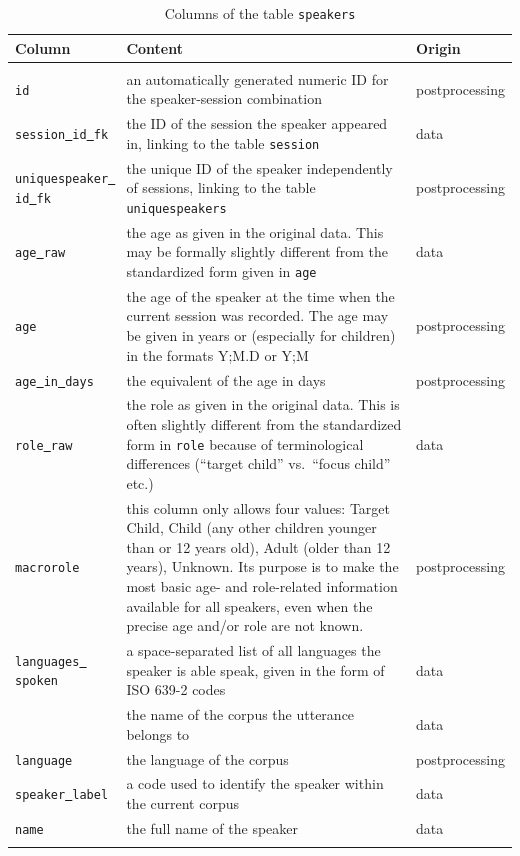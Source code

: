 \documentclass[a4paper, 11pt]{book}
\newcommand{\und}{\underline{{ }}\hspace{0.2mm}}	%
\begin{document}
\begin{longtable}{lp{.5\linewidth}p{.2\linewidth}}
	\toprule
		\textbf{Column} & \textbf{Content} 	& \textbf{Origin} \\
	\midrule
	\endhead
	
	\bottomrule\\[-0.15cm]
	\caption{Columns of the table \texttt{speakers}}
	\endfoot
	
		\texttt{id}				& an automatically generated numeric ID for the speaker-session combination & postprocessing \\
		\texttt{session\und id\und fk} & the ID of the session the speaker appeared in, linking to the table \texttt{session} & data \\
		\texttt{uniquespeaker\und id\und fk} & the unique ID of the speaker independently of sessions, linking to the table \texttt{uniquespeakers} & postprocessing \\
		\texttt{age\und raw} 	& the age as given in the original data. This may be formally slightly different from the standardized form given in \texttt{age} & data \\
		\texttt{age} 			& the age of the speaker at the time when the current session was recorded. The age may be given in years or (especially for children) in the formats Y;M.D or Y;M & postprocessing \\
		\texttt{age\und in\und days} & the equivalent of the age in days & postprocessing \\
		\texttt{role\und raw} 	& the role as given in the original data. This is often slightly different from the standardized form in 
		\texttt{role} because of terminological differences (“target child” vs.\ “focus child” etc.) & data \\
		\texttt{macrorole} 		& this column only allows four values: Target\und Child, Child (any other children younger than or 12 years old),  Adult (older than 12 years), Unknown. Its purpose is to make the most basic age- and role-related information available for all speakers, even when the precise age and/or role are not known. & postprocessing \\
		\texttt{languages\und spoken} & a space-separated list of all languages the speaker is able speak, given in the form of ISO 639-2 codes & data \\
\end{longtable}
\end{document}
